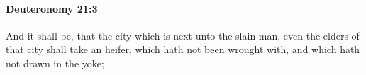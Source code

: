 
		\paragraph{Deuteronomy 21:3} %
			\label{DEUTERONOMY-21-3}

			And it shall be, that the city which is next unto the slain man, even the elders of that city shall take an heifer, which hath not been wrought with, and which hath not drawn in the yoke;


